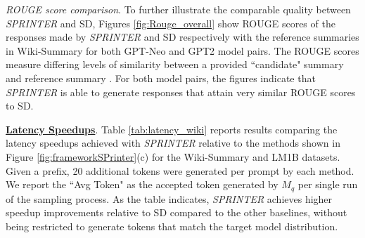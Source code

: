 \documentclass{article}
\newcommand{\revision}[1]{{\color{black} #1}}
\theoremstyle{plain}
\theoremstyle{definition}
\theoremstyle{remark}
\begin{document}
\textit{ROUGE score comparison}. To further illustrate the comparable quality between \textit{SPRINTER} and SD, Figures \ref{fig:Rouge_overall} show ROUGE scores \cite{lin-2004-rouge} of the responses made by \textit{SPRINTER} and SD respectively with the reference summaries in Wiki-Summary for both GPT-Neo and GPT2 model pairs. The ROUGE scores measure differing levels of similarity  between a provided ``candidate" summary  and reference summary \cite{lin-2004-rouge}. 
For both model pairs, the figures indicate that \textit{SPRINTER} is able to generate responses that attain very similar ROUGE scores to SD.  


\revision{
\noindent\textbf{\underline{Latency Speedups}}. Table \ref{tab:latency_wiki} reports results comparing the latency speedups achieved with \textit{SPRINTER} relative to the methods shown in Figure \ref{fig:frameworkSPrinter}(c) for the Wiki-Summary and LM1B datasets. 
Given a prefix, 20 additional tokens were generated per prompt by each method. We report the ``Avg Token" as the accepted token generated by $M_q$ per single run of the sampling process. As the table indicates, \textit{SPRINTER} achieves higher speedup improvements relative to SD compared to the other baselines, without being restricted to generate tokens that match the target model distribution.}




\begin{table}[t]
\centering
{}
\caption{\revision{Comparison of \textit{SPRINTER} with state-of-the-art methods (Medusa \cite{cai2024medusa}, Eagle2 \cite{li2406eagle} and Mentored Decoding \cite{tranthien2024mentored}) in terms of win-tie rate and speedup. Medusa and Eagle2 FLOPS to process $\gamma$ tokens from \cite{christopher2024speculative}, where $\tau_n, \tau_d, K$ are the number of nodes/depth of the draft tree and Medusa heads respectively.}}
\label{tab:sprinter_comparison}
\end{table}
\end{document}
